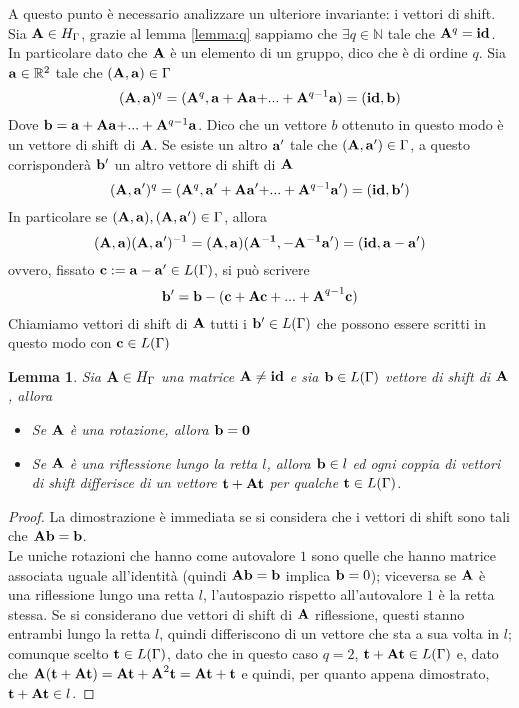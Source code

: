 \documentclass[a4paper,11pt,openright,twoside	]{book}
\newtheorem{lemma}[theorem]{Lemma}
\begin{document}
A questo punto è necessario analizzare un ulteriore invariante: i vettori di shift. 
Sia $\vb{A} \in H_{\Gamma}$, grazie al lemma \ref{lemma:q} sappiamo che $\exists q \in \mathbb{N}$ tale che $\vb{A}^q = \vb{id}$. In particolare dato  che $\vb{A}$ è un elemento di un gruppo, dico che è di ordine $q$.
Sia $\vb{a} \in \mathbb{R}^2$ tale che $(\vb{A, a}) \in \Gamma$
\[ (\vb{A,a})^q = (\vb{A}^q, \vb{a + Aa +}...+\vb{A}^{q-1}\vb{a}) = (\vb{id}, \vb{b} ) \]
Dove $\vb{b} = \vb{a + Aa +}...+\vb{A}^{q-1}\vb{a}$. Dico che un vettore $b$ ottenuto in questo modo è un vettore di shift di $\vb{A}$. 
Se esiste un altro $\vb{a'}$ tale che $(\vb{A, a'}) \in \Gamma$, a questo corrisponderà $\vb{b}'$ un altro vettore di shift di $\vb{A}$ 
\[ (\vb{A,a'})^q = (\vb{A}^q, \vb{a' + Aa' +}...+\vb{A}^{q-1}\vb{a}') = (\vb{id}, \vb{b'} ) \]
In particolare se $(\vb{A, a}), (\vb{A, a'}) \in \Gamma$, allora
\[ (\vb{A,a}) (\vb{A,a'})^{-1} = (\vb{A,a})(\vb{A^{-1}, -A^{-1}\vb{a}'}) = (\vb{id, a-a'})\]
ovvero, fissato $\vb{c}:=\vb{a-a'} \in L(\Gamma)$, si può scrivere
\[ \vb{b'} = \vb{b- (c+ Ac+...+ A}^{q-1} \vb{c} )\] 
Chiamiamo vettori di shift di $\vb{A}$ tutti i $\vb{b'} \in L(\Gamma)$ che possono essere scritti in questo modo con $\vb{c} \in L(\Gamma)$ \\
\begin{lemma}
\label{lemma:shift1}
Sia $\vb{A} \in H_{\Gamma}$ una matrice $\vb{A} \neq \vb{id}$ e sia $\vb{b} \in L(\Gamma)$ vettore di shift di $\vb{A}$, allora 
\begin{itemize}
\item Se $\vb{A}$ è una rotazione, allora $\vb{b} = \vb{0}$
\item Se $\vb{A}$ è una riflessione lungo la retta $l$, allora $\vb{b} \in l$ ed ogni coppia di vettori di shift differisce di un vettore $\vb{t} + \vb{At}$ per qualche $\vb{t} \in L(\Gamma)$. 
\end{itemize}
\end{lemma}
\begin{proof}
La dimostrazione è immediata se si considera che i vettori di shift sono tali che $\vb{Ab} = \vb{b}$. \\ Le uniche rotazioni che hanno come autovalore $1$ sono quelle che hanno matrice associata uguale all'identità (quindi $\vb{Ab} = \vb{b}$ implica $\vb{b} = 0$); viceversa se $\vb{A}$ è una riflessione lungo una retta $l$, l'autospazio rispetto all'autovalore $1$ è la retta stessa. Se si considerano due vettori di shift di $\vb{A}$ riflessione, questi stanno entrambi lungo la retta $l$, quindi differiscono di un vettore che sta a sua volta in $l$; comunque scelto $\vb{t} \in L(\Gamma)$, dato che in questo caso $q = 2$, $\vb{t + At} \in L(\Gamma)$ e, dato che $\vb{A(t + At)} = \vb{At + A}^2 \vb{t} = \vb{At + t}$ e quindi, per quanto appena dimostrato, $\vb{t + At} \in l$. 
\end{proof}
\end{document}
